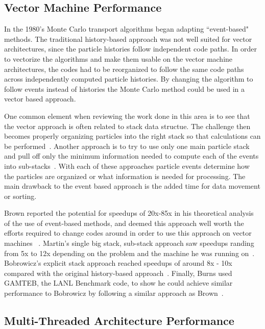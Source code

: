 \subsection*{Vector Machine Performance}

%
In the 1980's Monte Carlo transport algorithms began adapting ``event-based" methods.
%
The traditional history-based approach was not well suited for vector architectures, since the particle histories follow independent code paths.
%
In order to vectorize the algorithms and make them usable on the vector machine architectures, the codes had to be reorganized to follow the same code paths across independently computed particle histories.
%
By changing the algorithm to follow events instead of histories the Monte Carlo method could be used in a vector based approach. ~\cite{martin1986monte}
%

%
One common element when reviewing the work done in this area is to see that the vector approach is often related to stack data structue.
%
The challenge then becomes properly organizing particles into the right stack so that calculations can be performed~\cite{brown1984monte, bobrowicz1984vectorized}.
%
Another approach is to try to use only one main particle stack and pull off only the minimum information needed to compute each of the events into sub-stacks~\cite{martin1986monte}.
%
With each of these approaches particle events determine how the particles are organized or what information is needed for processing.
%
The main drawback to the event based approach is the added time for data movement or sorting.
%

%
Brown reported the potential for speedups of 20x-85x in his theoretical analysis of the use of event-based methods, and deemed this approach well worth the efforts required to change codes around in order to use this approach on vector machines ~\cite{brown1984monte}.
%
Martin's single big stack, sub-stack approach saw speedups randing from 5x to 12x depending on the problem and the machine he was running on~\cite{martin1986monte}.
%
Bobrowicz's explicit stack approach reached speedups of around 8x - 10x compared with the original history-based approach~\cite{bobrowicz1984vectorized}.
%
Finally, Burns used GAMTEB, the LANL Benchmark code, to show he could achieve similar performance to Bobrowicz by following a similar approach as Brown~\cite{burns1989vectorization}.
%

\subsection*{Multi-Threaded Architecture Performance}

